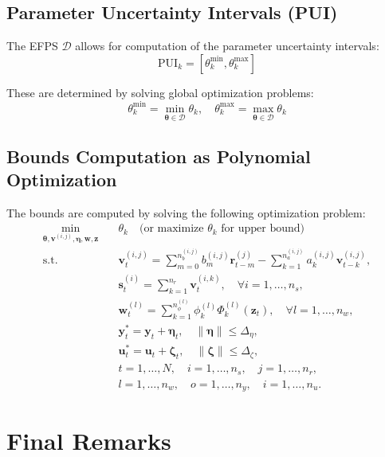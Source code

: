 \subsection{Parameter Uncertainty Intervals (PUI)}

The EFPS $\mathcal{D}$ allows for computation of the parameter uncertainty intervals:
\[
\text{PUI}_k = [\theta_k^\text{min}, \theta_k^\text{max}]
\]

These are determined by solving global optimization problems:
\[
\theta_k^\text{min} = \min_{\boldsymbol{\theta} \in \mathcal{D}} \theta_k, \quad \theta_k^\text{max} = \max_{\boldsymbol{\theta} \in \mathcal{D}} \theta_k
\]

\subsection{Bounds Computation as Polynomial Optimization}

The bounds are computed by solving the following optimization problem:
\[
\begin{aligned}
    \min_{\boldsymbol{\theta}, \mathbf{v}^{(i,j)}, \boldsymbol{\eta}, \mathbf{w}, \mathbf{z}} \quad & \theta_k \quad \text{(or maximize $\theta_k$ for upper bound)} \\
    \text{s.t.} \quad & \mathbf{v}_t^{(i,j)} = \sum_{m=0}^{n_b^{(i,j)}} b_m^{(i,j)} \mathbf{r}_{t-m}^{(j)} - \sum_{k=1}^{n_a^{(i,j)}} a_k^{(i,j)} \mathbf{v}_{t-k}^{(i,j)}, \\
    & \mathbf{s}_t^{(i)} = \sum_{k=1}^{n_r} \mathbf{v}_t^{(i,k)}, \quad \forall i = 1, \dots, n_s, \\
    & \mathbf{w}_t^{(l)} = \sum_{k=1}^{n_\phi^{(l)}} \phi_k^{(l)} \Phi_k^{(l)}(\mathbf{z}_t), \quad \forall l = 1, \dots, n_w, \\
    & \mathbf{y}_t^\ast = \mathbf{y}_t + \boldsymbol{\eta}_t, \quad \|\boldsymbol{\eta}\| \leq \Delta_\eta, \\
    & \mathbf{u}_t^\ast = \mathbf{u}_t + \boldsymbol{\zeta}_t, \quad \|\boldsymbol{\zeta}\| \leq \Delta_\zeta, \\
    & t = 1, \dots, N, \quad i = 1, \dots, n_s, \quad j = 1, \dots, n_r, \\
    & l = 1, \dots, n_w, \quad o = 1, \dots, n_y, \quad i = 1, \dots, n_u.
\end{aligned}
\]


\section*{Final Remarks}

